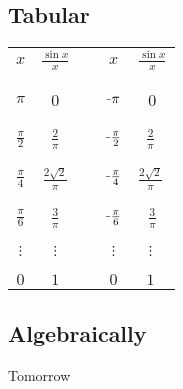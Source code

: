 \documentclass[20pt]{extarticle}
\newcommand{\m}{\scalebox{0.5}[1.0]{$-$}}
\begin{document}
\subsection*{\textbf{\color{draculaorange} Tabular}}
  \begin{table*}[h]
    \begin{tabular}{c | c | c | c | c}
    $x$ & $\frac{\sin x}{x}$                   &\(\ \)&$x$ & $\frac{\sin x}{x}$                                             \\
    \(\ \)& \(\ \)& \(\ \)& \(\ \)& \(\ \)\\ \hline
    \(\ \)& \(\ \)& \(\ \)& \(\ \)& \(\ \)\\
    $\pi   $         & 0                       &\(\ \)&$\m \pi   $         & 0                                              \\
    \(\ \)& \(\ \)& \(\ \)& \(\ \)& \(\ \)\\ \hline
    \(\ \)& \(\ \)& \(\ \)& \(\ \)& \(\ \)\\
    $\frac{\pi }{ 2}$& $\frac{2}{\pi}$         &\(\ \)&$\m \frac{\pi }{ 2}$& $\frac{2}{\pi}\ $                                \\
    \(\ \)& \(\ \)& \(\ \)& \(\ \)& \(\ \)\\ \hline
    \(\ \)& \(\ \)& \(\ \)& \(\ \)& \(\ \)\\
           $\frac{\pi }{ 4}$& $\frac{2\sqrt{2}}{\pi}$ &\(\ \)&$\m \frac{\pi }{ 4}$& $\frac{2\sqrt{2}}{\pi}\ $ \\
    \(\ \)& \(\ \)& \(\ \)& \(\ \)& \(\ \)\\ \hline
    \(\ \)& \(\ \)& \(\ \)& \(\ \)& \(\ \)\\
    $\frac{\pi }{ 6}$ &$\frac{3}{\pi}$      &\(\ \)&$\m \frac{\pi }{ 6}$& $\frac{3}{\pi}$         \\
    \(\ \)& \(\ \)& \(\ \)& \(\ \)& \(\ \)\\ \hline
    \(\ \)& \(\ \)& \(\ \)& \(\ \)& \(\ \)\\
    $\vdots$ &\(\vdots\)&\(\ \)&$\vdots$& $\vdots\ $ \\
    \(\ \)& \(\ \)& \(\ \)& \(\ \)& \(\ \)\\ \hline
    \(\ \)& \(\ \)& \(\ \)& \(\ \)& \(\ \)\\
    $0$ &\(1\)&\(\ \)&$0$& $1\ $ \\
    \end{tabular}
    \end{table*}
\newpage
\subsection*{\textbf{\color{draculaorange} Algebraically}}
Tomorrow
\newpage
\end{document}
